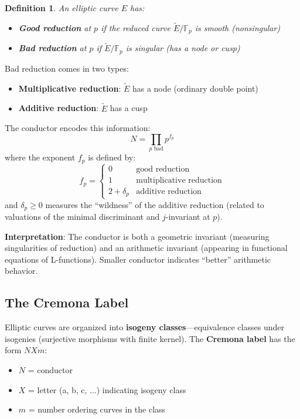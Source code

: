 \documentclass[11pt]{article}
\newtheorem{definition}[theorem]{Definition}
\begin{document}
\begin{definition}
An elliptic curve $E$ has:
\begin{itemize}
\item \textbf{Good reduction} at $p$ if the reduced curve $\tilde{E}/\mathbb{F}_p$ is smooth (nonsingular)
\item \textbf{Bad reduction} at $p$ if $\tilde{E}/\mathbb{F}_p$ is singular (has a node or cusp)
\end{itemize}
\end{definition}

Bad reduction comes in two types:
\begin{itemize}
\item \textbf{Multiplicative reduction}: $\tilde{E}$ has a node (ordinary double point)
\item \textbf{Additive reduction}: $\tilde{E}$ has a cusp
\end{itemize}

The conductor encodes this information:
$$N = \prod_{p \text{ bad}} p^{f_p}$$
where the exponent $f_p$ is defined by:
$$f_p = \begin{cases}
0 & \text{good reduction} \\
1 & \text{multiplicative reduction} \\
2 + \delta_p & \text{additive reduction}
\end{cases}$$
and $\delta_p \geq 0$ measures the ``wildness'' of the additive reduction (related to valuations of the minimal discriminant and $j$-invariant at $p$).

\textbf{Interpretation}: The conductor is both a geometric invariant (measuring singularities of reduction) and an arithmetic invariant (appearing in functional equations of L-functions). Smaller conductor indicates ``better'' arithmetic behavior.

\subsection{The Cremona Label}

Elliptic curves are organized into \textbf{isogeny classes}---equivalence classes under isogenies (surjective morphisms with finite kernel). The \textbf{Cremona label} has the form $NXm$:
\begin{itemize}
\item $N$ = conductor
\item $X$ = letter (a, b, c, ...) indicating isogeny class
\item $m$ = number ordering curves in the class
\end{itemize}
\end{document}
